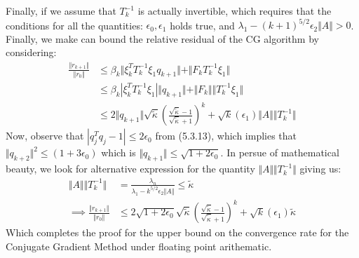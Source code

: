 \documentclass[]{article}
\theoremstyle{definition}
\begin{document}
            Finally, if we assume that $T_k^{-1}$ is actually invertible, which requires that the conditions for all the quantities: $\epsilon_0, \epsilon_1$ holds true, and $\lambda_1 - (k + 1)^{5/2} \epsilon_2\Vert A\Vert > 0$. Finally, we make can bound the relative residual of the CG algorithm by considering: 
            \begin{align}
                \frac{\Vert r_{k + 1}\Vert}
                {
                    \Vert r_0\Vert
                } &\le
                \beta_k \Vert
                    \xi_k^T T_k^{-1}\xi_1 q_{k + 1}
                \Vert + 
                \Vert F_kT_k^{-1}\xi_1 \Vert
                \\
                & \le 
                \beta_k|\xi_k^T T_k^{-1}\xi_1|
                \Vert q_{k + 1}\Vert + 
                \Vert F_k\Vert  \Vert T^{-1}_k\xi_1\Vert
                \\
                & \le 
                2 \Vert q_{k + 1}\Vert\sqrt{\tilde{\kappa}}
                    \left(
                        \frac{\sqrt{\tilde{\kappa}} - 1}{\sqrt{\tilde{\kappa}} + 1}
                    \right)^k
                + 
                \sqrt{k}(\epsilon_1) \Vert A\Vert 
                \Vert T^{-1}_k\Vert
            \end{align}
            Now, observe that $|q_j^Tq_j - 1|\le 2\epsilon_0$ from (5.3.13), which implies that $\Vert q_{k + 2}\Vert^2 \le (1 + 3\epsilon_0)$ which is $\Vert q_{k + 1}\Vert \le \sqrt{1 + 2\epsilon_0}$. In persue of mathematical beauty, we look for alternative expression for the quantity $\Vert A\Vert \Vert T^{-1}_k\Vert$ giving us: 
            \begin{align}
                \Vert A\Vert\Vert T_k^{-1}\Vert &= \frac{\lambda_n}{\lambda_1 - k^{5/2}\epsilon_2\Vert A\Vert} \le \tilde{\kappa}
                \\
                \implies 
                \frac{\Vert r_{k + 1}\Vert}
                {
                    \Vert r_0\Vert
                } &\le 
                2  \sqrt{1 + 2\epsilon_0}\sqrt{\tilde{\kappa}}
                    \left(
                        \frac{\sqrt{\tilde{\kappa}} - 1}{\sqrt{\tilde{\kappa}} + 1}
                    \right)^k
                + \sqrt{k}(\epsilon_1) \tilde{\kappa}
            \end{align}
            Which completes the proof for the upper bound on the convergence rate for the Conjugate Gradient Method under floating point arithematic. 
\end{document}

